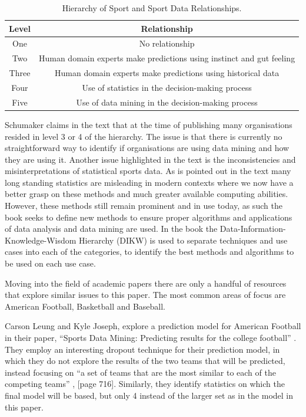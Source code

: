 \documentclass{imc-inf}
\begin{document}
	\begin{table}[h!]
		\centering	
		\begin{tabular}{| c | c |}
			\hline
			Level & Relationship\\
			\hline
			One & No relationship \\
			\hline
			Two & Human domain experts make predictions using instinct and gut feeling \\
			\hline
			Three & Human domain experts make predictions using historical data \\
			\hline
			Four & Use of statistics in the decision-making process \\
			\hline
			Five & Use of data mining in the decision-making process  \\
			\hline			
		\end{tabular}
		\caption{\label {tab:Sport Data Relation}Hierarchy of Sport and Sport Data Relationships.}		
	\end{table}
	
	Schumaker claims in the text that at the time of publishing many organisations resided in level 3 or 4 of the hierarchy.  The issue is that there is currently no straightforward way to identify if organisations are using data mining and how they are using it. 
	Another issue highlighted in the text is the inconsistencies and misinterpretations of statistical sports data. As is pointed out in the text many long standing statistics are misleading in modern contexts where we now have a better grasp on these methods and much greater available computing abilities. However, these methods still remain prominent and in use today, as such the book seeks to define new methods to ensure proper algorithms and applications of data analysis and data mining are used. 
	In the book the Data-Information-Knowledge-Wisdom Hierarchy (DIKW) is used to separate techniques and use cases into each of the categories, to identify the best methods and algorithms to be used on each use case. 
		
	Moving into the field of academic papers there are only a handful of resources that explore similar issues to this paper. The most common areas of focus are American Football, Basketball and Baseball. 
	
	Carson Leung and Kyle Joseph, explore a prediction model for American Football in their paper, “Sports Data Mining: Predicting results for the college football” \cite{CollegeFootball}. They employ an interesting dropout technique for their prediction model, in which they do not explore the results of the two teams that will be predicted, instead focusing on “a set of teams that are the most similar to each of the competing teams” \cite{CollegeFootball}, [page 716]. Similarly, they identify statistics on which the final model will be based, but only 4 instead of the larger set as in the model in this paper.
	
\end{document}
